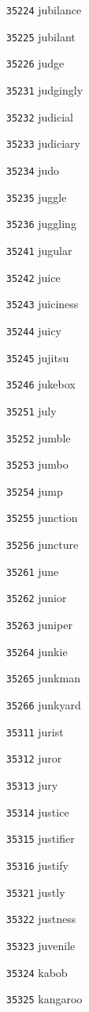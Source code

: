 \documentclass[twoside,11pt]{article}
\begin{document}
\begin{multicols}{5}
\begin{enumerate}
\item[\texttt{35224}] jubilance
\item[\texttt{35225}] jubilant
\item[\texttt{35226}] judge
\item[\texttt{35231}] judgingly
\item[\texttt{35232}] judicial
\item[\texttt{35233}] judiciary
\item[\texttt{35234}] judo
\item[\texttt{35235}] juggle
\item[\texttt{35236}] juggling
\item[\texttt{35241}] jugular
\item[\texttt{35242}] juice
\item[\texttt{35243}] juiciness
\item[\texttt{35244}] juicy
\item[\texttt{35245}] jujitsu
\item[\texttt{35246}] jukebox
\item[\texttt{35251}] july
\item[\texttt{35252}] jumble
\item[\texttt{35253}] jumbo
\item[\texttt{35254}] jump
\item[\texttt{35255}] junction
\item[\texttt{35256}] juncture
\item[\texttt{35261}] june
\item[\texttt{35262}] junior
\item[\texttt{35263}] juniper
\item[\texttt{35264}] junkie
\item[\texttt{35265}] junkman
\item[\texttt{35266}] junkyard
\item[\texttt{35311}] jurist
\item[\texttt{35312}] juror
\item[\texttt{35313}] jury
\item[\texttt{35314}] justice
\item[\texttt{35315}] justifier
\item[\texttt{35316}] justify
\item[\texttt{35321}] justly
\item[\texttt{35322}] justness
\item[\texttt{35323}] juvenile
\item[\texttt{35324}] kabob
\item[\texttt{35325}] kangaroo

\end{enumerate}
\end{multicols}
\end{document}
